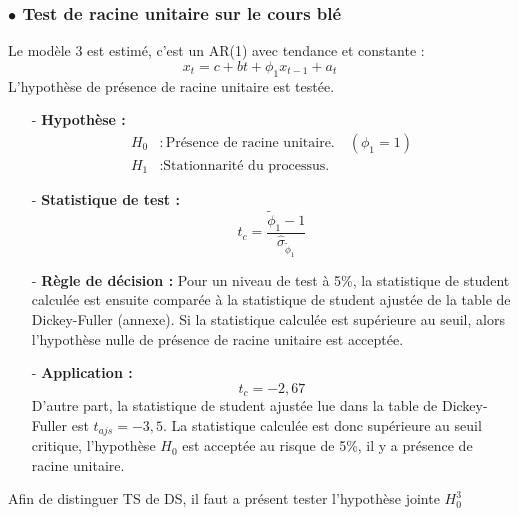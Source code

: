 \subsubsection*{$\bullet$ Test de racine unitaire sur le cours blé}
Le modèle 3 est estimé, c'est un AR(1) avec tendance et constante :
\begin{equation*}
    x_{t} = c + bt + \phi_{1} x_{t-1} + a_{t}
\end{equation*}
L'hypothèse de présence de racine unitaire est testée.
%
\begin{itemize}
\item[-]\textbf{ Hypothèse :} 
\begin{equation*}
    \begin{split}
        H_{0} &: \text{Présence de racine unitaire.}  \quad  (\phi_{1} = 1)\\
        H_{1} &: \text{Stationnarité du processus.}
    \end{split}
\end{equation*}
\item[-]\textbf{Statistique de test :} 
\begin{equation*}
    t_{c} = \frac{\tilde{\phi}_{1}- 1}{\hat{\sigma}_{\tilde{\phi}_{1}}}
\end{equation*}
\item[-]\textbf{Règle de décision :} Pour un niveau de test à 5\%, la statistique de student calculée est ensuite comparée à la statistique de student ajustée de la table 
de Dickey-Fuller (annexe). Si la statistique calculée est supérieure au seuil, alors l'hypothèse nulle de présence de racine unitaire est acceptée.
\item[-]\textbf{Application :} 
\begin{equation*}
    t_{c} = -2,67
\end{equation*}
D'autre part, la statistique de student ajustée lue dans la table de Dickey-Fuller est $t_{ajs} = - 3,5$. La statistique calculée est donc supérieure au seuil critique,
l'hypothèse $H_{0}$ est acceptée au risque de 5\%, il y a présence de racine unitaire.
\end{itemize}
%
Afin de distinguer TS de DS, il faut a présent tester l'hypothèse jointe $H_{0}^{3}$
%
